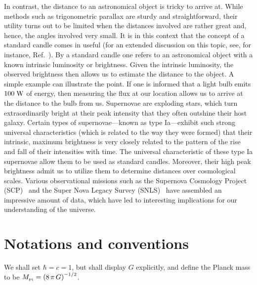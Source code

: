 \documentclass[12pt,a4paper,oneside]{book}
\def\Mpl{M_{_{\rm Pl}}}
\begin{document}
\par

In contrast, the distance to an astronomical object is tricky to arrive at.
While methods such as trigonometric parallax are sturdy and straightforward,
their utility turns out to be limited when the distances involved are rather 
great and, hence, the angles involved very small.  
It is in this context that the concept of a standard candle comes in useful
(for an extended discussion on this topic, see, for instance,
Ref.~\cite{webb-1999}).
By a standard candle one refers to an astronomical object with a known
intrinsic 
luminosity or brightness.
Given the intrinsic luminosity, the observed brightness then allows us to 
estimate the distance to the object.
A simple example can illustrate the point.
If one is informed that a light bulb emits $100\; {\rm W}$ of energy, then
measuring the flux at our location allows us to arrive at the distance to 
the bulb from us.
Supernovae are exploding stars, which turn extraordinarily bright at their
peak intensity that they often outshine their host galaxy.
Certain types of supernovae---known as type Ia---exhibit such strong universal 
characteristics (which is related to the way they were formed) that their 
intrinsic, maximum brightness is very closely related to the pattern of the 
rise and fall of their intensities with time. 
The universal characteristic of these type Ia supernovae allow them to be used
as standard candles.
Moreover, their high peak brightness admit us to utilize them to determine
distances over cosmological scales.
Various observational missions such as the Supernova Cosmology 
Project (SCP)~\cite{scp} and the Super Nova Legacy Survey (SNLS)~\cite{snls} 
have assembled an impressive amount of data, which have led to interesting 
implications for our understanding of the universe.


\section{}



\section{Notations and conventions}


We shall set $\hbar=c=1$, but shall display $G$ explicitly, and define 
the Planck mass to be $\Mpl=\left(8\, \pi\, G\right)^{-1/2}$.
\end{document}
